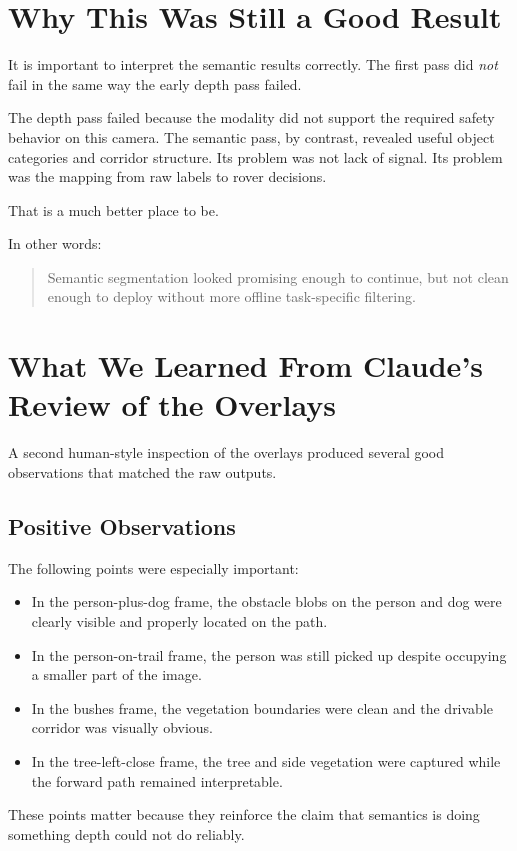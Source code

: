 \documentclass[11pt]{article}
\begin{document}
\section{Why This Was Still a Good Result}
It is important to interpret the semantic results correctly. The first pass did \emph{not} fail in the same way the early depth pass failed.

The depth pass failed because the modality did not support the required safety behavior on this camera. The semantic pass, by contrast, revealed useful object categories and corridor structure. Its problem was not lack of signal. Its problem was the mapping from raw labels to rover decisions.

That is a much better place to be.

In other words:
\begin{quote}
Semantic segmentation looked promising enough to continue, but not clean enough to deploy without more offline task-specific filtering.
\end{quote}

\section{What We Learned From Claude's Review of the Overlays}
A second human-style inspection of the overlays produced several good observations that matched the raw outputs.

\subsection{Positive Observations}
The following points were especially important:
\begin{itemize}[leftmargin=*]
\item In the person-plus-dog frame, the obstacle blobs on the person and dog were clearly visible and properly located on the path.
\item In the person-on-trail frame, the person was still picked up despite occupying a smaller part of the image.
\item In the bushes frame, the vegetation boundaries were clean and the drivable corridor was visually obvious.
\item In the tree-left-close frame, the tree and side vegetation were captured while the forward path remained interpretable.
\end{itemize}

These points matter because they reinforce the claim that semantics is doing something depth could not do reliably.
\end{document}
